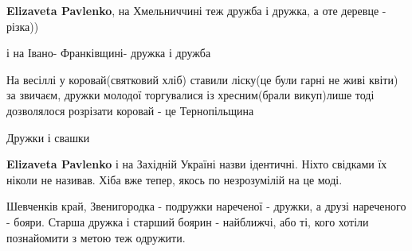 \begin{itemize}
\begin{itemize}
\textbf{Elizaveta Pavlenko}, на Хмельниччині теж дружба і дружка, а оте деревце - різка))

 
і на Івано- Франківщині- дружка і дружба

 

На весіллі у коровай(святковий хліб) ставили ліску(це були гарні не живі квіти)
за звичаєм, дружки молодої торгувалися із хресним(брали викуп)лише тоді
дозволялося розрізати коровай - це Тернопільщина

 
Дружки і свашки

 
\textbf{Elizaveta Pavlenko} і на Західній Україні назви ідентичні. Ніхто свідками їх ніколи не називав. Хіба вже тепер, якось по незрозумілій на це моді.

 
Шевченків край, Звенигородка - подружки нареченої - дружки, а друзі нареченого - бояри. Старша дружка і старший боярин - найближчі, або ті, кого хотіли познайомити з метою теж одружити.

 

\end{itemize}
\end{itemize}
